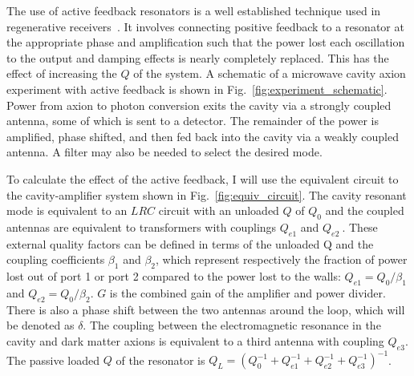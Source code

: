 \documentclass[aps,prl,twocolumn,groupedaddress]{revtex4-1}
\begin{document}
The use of active feedback resonators is a well established technique used in regenerative receivers~\cite{armstrong1914wireless}.
It involves connecting positive feedback to a resonator at the appropriate phase and amplification such that the power lost each oscillation to the output and damping effects is nearly completely replaced.  
This has the effect of increasing the $Q$ of the system.
A schematic of a microwave cavity axion experiment with active feedback is shown in Fig.~\ref{fig:experiment_schematic}.   Power from axion to photon conversion exits the cavity via a strongly coupled antenna, some of which is sent to a detector.  The remainder of the power is amplified, phase shifted, and then fed back into the cavity via a weakly coupled antenna.  A filter may also be needed to select the desired mode. 

To calculate the effect of the active feedback, I will use the equivalent circuit to the cavity-amplifier system shown in Fig.~\ref{fig:equiv_circuit}.  The cavity resonant mode is equivalent to an $LRC$ circuit with an unloaded $Q$ of $Q_0$ and the coupled antennas are equivalent to transformers with couplings $Q_{e1}$ and $Q_{e2}~$\cite{Montgomery:1948}.  These external quality factors can be defined in terms of the unloaded Q and the coupling coefficients $\beta_1$ and $\beta_2$, which represent respectively the fraction of power lost out of port 1 or port 2 compared to the power lost to the walls: $Q_{e1} = Q_0/\beta_1$ and $Q_{e2} = Q_0/\beta_2$. $G$ is the combined gain of the amplifier and power divider.  There is also a phase shift between the two antennas around the loop, which will be denoted as $\delta$.  The coupling between the electromagnetic resonance in the cavity and dark matter axions is equivalent to a third antenna with coupling $Q_{e3}$.  The passive loaded $Q$ of the resonator is $Q_L=\left(Q_0^{-1}+Q_{e1}^{-1}+Q_{e2}^{-1}+Q_{e3}^{-1}\right)^{-1}$.
\end{document}
